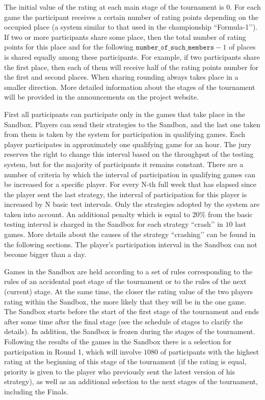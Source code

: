 The initial value of the rating at each main stage of the tournament is $0$. For each game the participant receives a certain number of rating points
depending on the occupied place (a system similar to that used in the championship ``Formula-1’’). If two or more participants share
some place, then the total number of rating points for this place and for the following $\texttt{number\_of\_such\_members}-1$ of places is shared
equally among these participants. For example, if two participants share the first place, then each of them will receive half of the rating points number
for the first and second places. When sharing rounding always takes place in a smaller direction. More detailed information about the stages of the tournament will be
provided in the announcements on the project website.

First all participants can participate only in the games that take place in the Sandbox. Players can send their strategies to the Sandbox, and
the last one taken from them is taken by the system for participation in qualifying games. Each player participates in approximately one qualifying
game for an hour. The jury reserves the right to change this interval based on the throughput of the testing system, but for
the majority of participants it remains constant. There are a number of criteria by which the interval of participation in qualifying games
can be increased for a specific player. For every N-th full week that has elapsed since the player sent the last strategy, the interval
of participation for this player is increased by N basic test intervals. Only the strategies adopted by the system are taken into account. An additional penalty which is equal to $20\%$ from the basic testing interval is charged in the Sandbox for each strategy ``crash’’ in $10$ last games.
More details about the causes of the strategy ``crashing’’ can be found in the following sections. The player’s participation interval in the Sandbox can not become bigger than a day.

Games in the Sandbox are held according to a set of rules corresponding to the rules of an accidental past stage of the tournament or to the rules of the next
(current) stage. At the same time, the closer the rating value of the two players rating within the Sandbox, the more likely that they will be in the
one game. The Sandbox starts before the start of the first stage of the tournament and ends after some time after the final stage (see the schedule
of stages to clarify the details). In addition, the Sandbox is frozen during the stages of the tournament. Following the results of the games in the Sandbox
there is a selection for participation in Round 1, which will involve $1080$ of participants with the highest rating at the beginning of this stage of the tournament
(if the rating is equal, priority is given to the player who previously sent the latest version of his strategy), as well as an additional selection to
the next stages of the tournament, including the Finals.

